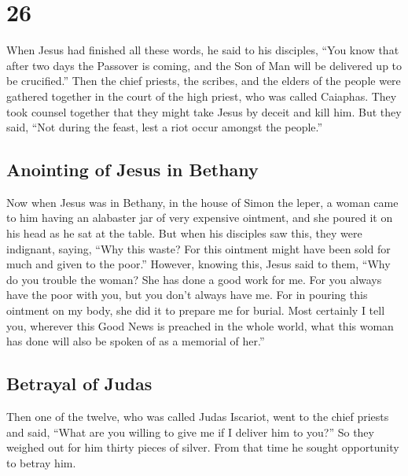 \hypertarget{section-25}{%
\section{26}\label{section-25}}

 When Jesus had finished all these words, he said to his
disciples,  ``You know that after two days the Passover is
coming, and the Son of Man will be delivered up to be crucified.''
 Then the chief priests, the scribes, and the elders of
the people were gathered together in the court of the high priest, who
was called Caiaphas.  They took counsel together that they
might take Jesus by deceit and kill him.  But they said,
``Not during the feast, lest a riot occur amongst the people.''

\hypertarget{anointing-of-jesus-in-bethany}{%
\subsection{Anointing of Jesus in
Bethany}\label{anointing-of-jesus-in-bethany}}

 Now when Jesus was in Bethany, in the house of Simon the
leper,  a woman came to him having an alabaster jar of
very expensive ointment, and she poured it on his head as he sat at the
table.  But when his disciples saw this, they were
indignant, saying, ``Why this waste?  For this ointment
might have been sold for much and given to the poor.'' 
However, knowing this, Jesus said to them, ``Why do you trouble the
woman? She has done a good work for me.  For you always
have the poor with you, but you don't always have me. 
For in pouring this ointment on my body, she did it to prepare me for
burial.  Most certainly I tell you, wherever this Good
News is preached in the whole world, what this woman has done will also
be spoken of as a memorial of her.''

\hypertarget{betrayal-of-judas}{%
\subsection{Betrayal of Judas}\label{betrayal-of-judas}}

 Then one of the twelve, who was called Judas Iscariot,
went to the chief priests  and said, ``What are you
willing to give me if I deliver him to you?'' So they weighed out for
him thirty pieces of silver.  From that time he sought
opportunity to betray him.

